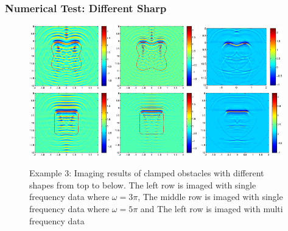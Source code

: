 \documentclass[utf-8,8pt]{beamer}
\newcommand{\om}{\omega}
\begin{document}
\begin{frame}
\frametitle{Numerical Test: Different Sharp}
\begin{figure}[h]
    \centering
	\includegraphics[width=0.32\textwidth]{./graphic/p_leaf_3pi.eps}
	\includegraphics[width=0.32\textwidth]{./graphic/p_leaf_5pi.eps}
	\includegraphics[width=0.32\textwidth]{./graphic/p_leaf.eps}\\
	\includegraphics[width=0.32\textwidth]{./graphic/rectangle_3pi.eps}
	\includegraphics[width=0.32\textwidth]{./graphic/rectangle_5pi.eps}
	\includegraphics[width=0.32\textwidth]{./graphic/rectangle.eps}
\caption{Example 3: Imaging results of clamped obstacles
		with different shapes from top to below. The left row is imaged with single frequency data where $\om=3\pi$, The middle row is imaged with single frequency data where $\om=5\pi$ and The left row is imaged with multi frequency data}
\end{figure}
\end{frame}
\end{document}
